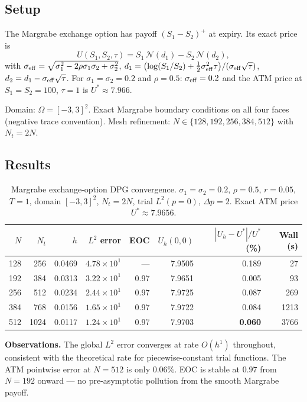 \documentclass[11pt,a4paper]{article}
\begin{document}
\subsection{Setup}

The Margrabe exchange option has payoff $(S_1 - S_2)^+$ at expiry.
Its exact price is
\[
  U(S_1,S_2,\tau) = S_1\,\mathcal{N}(d_1) - S_2\,\mathcal{N}(d_2),
\]
with $\sigma_{\rm eff} = \sqrt{\sigma_1^2 - 2\rho\sigma_1\sigma_2 + \sigma_2^2}$,
$d_1 = \bigl(\log(S_1/S_2) + \tfrac{1}{2}\sigma_{\rm eff}^2\tau\bigr)/(\sigma_{\rm eff}\sqrt\tau)$,
$d_2 = d_1 - \sigma_{\rm eff}\sqrt\tau$.
For $\sigma_1=\sigma_2=0.2$ and $\rho=0.5$: $\sigma_{\rm eff} = 0.2$ and the
ATM price at $S_1=S_2=100$, $\tau=1$ is $U^*\approx 7.966$.

Domain: $\Omega = [-3,3]^2$.
Exact Margrabe boundary conditions on all four faces (negative trace convention).
Mesh refinement: $N \in \{128,192,256,384,512\}$ with $N_t = 2N$.

\subsection{Results}

\begin{table}[htbp]
\centering
\caption{Margrabe exchange-option DPG convergence.
  $\sigma_1=\sigma_2=0.2$, $\rho=0.5$, $r=0.05$, $T=1$,
  domain $[-3,3]^2$, $N_t=2N$, trial $L^2(p{=}0)$, $\Delta p=2$.
  Exact ATM price $U^* \approx 7.9656$.}
\label{tab:margrabe}
\begin{tabular}{rrrrrrrr}
\toprule
$N$ & $N_t$ & $h$ & $L^2$ error & EOC & $U_h(0,0)$ & $|U_h - U^*|/U^*$ (\%) & Wall (s) \\
\midrule
  128 &  256 & 0.0469 & $4.78\times10^{1}$ & ---  & 7.9505 & 0.189 &    27 \\
  192 &  384 & 0.0313 & $3.22\times10^{1}$ & 0.97 & 7.9651 & 0.005 &    93 \\
  256 &  512 & 0.0234 & $2.44\times10^{1}$ & 0.97 & 7.9725 & 0.087 &   269 \\
  384 &  768 & 0.0156 & $1.65\times10^{1}$ & 0.97 & 7.9722 & 0.084 &  1213 \\
  512 & 1024 & 0.0117 & $1.24\times10^{1}$ & 0.97 & 7.9703 & \textbf{0.060} & 3766 \\
\bottomrule
\end{tabular}
\end{table}

\textbf{Observations.}
The global $L^2$ error converges at rate $O(h^1)$ throughout, consistent
with the theoretical rate for piecewise-constant trial functions.
The ATM pointwise error at $N=512$ is only $0.06\%$.
EOC is stable at $0.97$ from $N=192$ onward --- no pre-asymptotic pollution
from the smooth Margrabe payoff.
\end{document}
